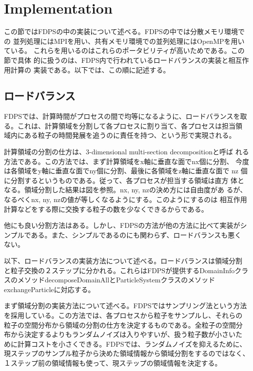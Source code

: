 \documentclass[12pt,a4paper]{jarticle}
\begin{document}


\section{Implementation}

この節ではFDPSの中の実装について述べる。FDPSの中では分散メモリ環境での
並列処理にはMPIを用い、共有メモリ環境での並列処理にはOpenMPを用いている。
これらを用いるのはこれらのポータビリティが高いためである。この節で具体
的に扱うのは、FDPS内で行われているロードバランスの実装と相互作用計算の
実装である。以下では、この順に記述する。

\subsection{ロードバランス}

FDPSでは、計算時間がプロセスの間で均等になるように、ロードバランスを取
る。これは、計算領域を分割して各プロセスに割り当て、各プロセスは担当領
域内にある粒子の時間発展を追うのに責任を持つ、という形で実現される。

計算領域の分割の仕方は、3-dimensional multi-section decompositionと呼ば
れる方法である。この方法では、まず計算領域をx軸に垂直な面でnx個に分割、
今度は各領域をy軸に垂直な面でny個に分割、最後に各領域をz軸に垂直な面で
nz 個に分割するというものである。従って、各プロセスが担当する領域は直方
体となる。領域分割した結果は図を参照。nx, ny, nzの決め方には自由度があ
るが、なるべくnx, ny, nzの値が等しくなるようにする。このようにするのは
相互作用計算などをする際に交換する粒子の数を少なくできるからである。

他にも良い分割方法はある。しかし、FDPSの方法が他の方法に比べて実装がシ
ンプルである。また、シンプルであるのにも関わらず、ロードバランスも悪く
ない。

以下、ロードバランスの実装方法について述べる。ロードバランスは領域分割
と粒子交換の２ステップに分かれる。これらはFDPSが提供するDomainInfoクラ
スのメソッドdecomposeDomainAllとParticleSystemクラスのメソッド
exchangeParticleに対応する。

まず領域分割の実装方法について述べる。FDPSではサンプリング法という方法
を採用している。この方法では、各プロセスから粒子をサンプルし、それらの
粒子の空間分布から領域の分割の仕方を決定するものである。全粒子の空間分
布から決定するよりもランダムノイズは入りやすいが、扱う粒子数が小さいた
めに計算コストを小さくできる。FDPSでは、ランダムノイズを抑えるために、
現ステップのサンプル粒子から決めた領域情報から領域分割をするのではなく、
１ステップ前の領域情報も使って、現ステップの領域情報を決定する。
\end{document}
